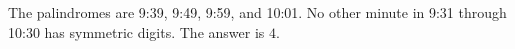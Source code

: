 The palindromes are 9:39, 9:49, 9:59, and 10:01. No other minute in 9:31 through 10:30 has symmetric digits. The answer is $\boxed4$.
